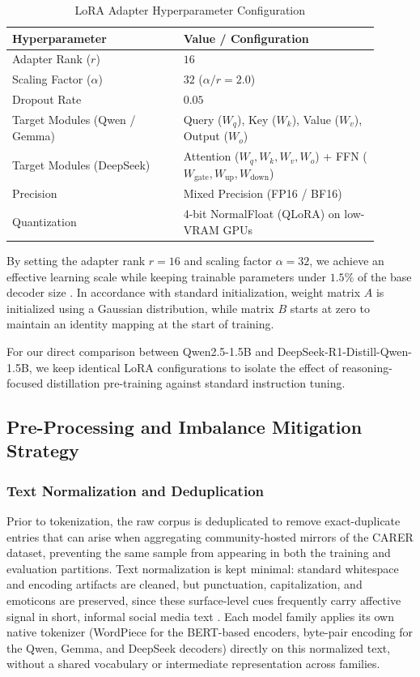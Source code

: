 \documentclass[conference]{IEEEtran}
\begin{document}
\begin{table}[htbp]
\centering
\caption{LoRA Adapter Hyperparameter Configuration}
\label{tab:peft_config}
\fontsize{8.5pt}{10.5pt}\selectfont
\begin{tabular}{p{0.42\linewidth} p{0.48\linewidth}}
\toprule
\textbf{Hyperparameter} & \textbf{Value / Configuration} \\
\midrule
Adapter Rank ($r$) & $16$ \\
Scaling Factor ($\alpha$) & $32$ ($\alpha / r = 2.0$) \\
Dropout Rate & $0.05$ \\
Target Modules (Qwen / Gemma) & Query ($W_q$), Key ($W_k$), Value ($W_v$), Output ($W_o$) \\
Target Modules (DeepSeek) & Attention ($W_q, W_k, W_v, W_o$) + FFN ($W_{\text{gate}}, W_{\text{up}}, W_{\text{down}}$) \\
Precision & Mixed Precision (FP16 / BF16) \\
Quantization & 4-bit NormalFloat (QLoRA) on low-VRAM GPUs \\
\bottomrule
\end{tabular}
\end{table}

By setting the adapter rank $r = 16$ and scaling factor $\alpha = 32$, we achieve an effective learning scale while keeping trainable parameters 
under $1.5\%$ of the base decoder size \cite{nwaiwu2025peft}. In accordance with standard initialization, weight matrix $A$ is initialized using 
a Gaussian distribution, while matrix $B$ starts at zero to maintain an identity mapping at the start of training.

For our direct comparison between Qwen2.5-1.5B and DeepSeek-R1-Distill-Qwen-1.5B, we keep identical LoRA configurations to isolate the effect of 
reasoning-focused distillation pre-training against standard instruction tuning.

\subsection{Pre-Processing and Imbalance Mitigation Strategy}

\subsubsection{Text Normalization and Deduplication}
Prior to tokenization, the raw corpus is deduplicated to remove exact-duplicate entries that can arise when aggregating community-hosted mirrors of the CARER dataset, preventing the same sample from appearing in both the training and evaluation partitions. Text normalization is kept minimal: standard whitespace and encoding artifacts are cleaned, but punctuation, capitalization, and emoticons are preserved, since these surface-level cues frequently carry affective signal in short, informal social media text \cite{maruf2024challenges}. Each model family applies its own native tokenizer (WordPiece for the BERT-based encoders, byte-pair encoding for the Qwen, Gemma, and DeepSeek decoders) directly on this normalized text, without a shared vocabulary or intermediate representation across families.
\end{document}
